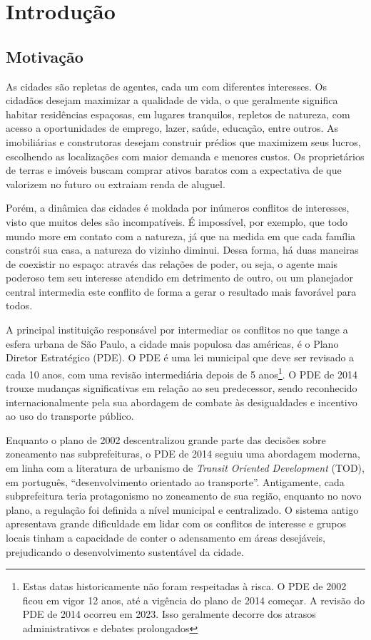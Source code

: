 \chapter{Introdução}

\section{Motivação}

As cidades são repletas de agentes, cada um com diferentes interesses. Os cidadãos desejam maximizar a qualidade de vida, o que geralmente significa habitar residências espaçosas, em lugares tranquilos, repletos de natureza, com acesso a oportunidades de emprego, lazer, saúde, educação, entre outros. As imobiliárias e construtoras desejam construir prédios que maximizem seus lucros, escolhendo as localizações com maior demanda e menores custos. Os proprietários de terras e imóveis buscam comprar ativos baratos com a expectativa de que valorizem no futuro ou extraiam renda de aluguel. 

Porém, a dinâmica das cidades é moldada por inúmeros conflitos de interesses, visto que muitos deles são incompatíveis. É impossível, por exemplo, que todo mundo more em contato com a natureza, já que na medida em que cada família constrói sua casa, a natureza do vizinho diminui. Dessa forma, há duas maneiras de coexistir no espaço: através das relações de poder, ou seja, o agente mais poderoso tem seu interesse atendido em detrimento de outro, ou um planejador central intermedia este conflito de forma a gerar o resultado mais favorável para todos.

A principal instituição responsável por intermediar os conflitos no que tange a esfera urbana de São Paulo, a cidade mais populosa das américas, é o Plano Diretor Estratégico (PDE). O PDE é uma lei municipal que deve ser revisado a cada 10 anos, com uma revisão intermediária depois de 5 anos\footnote{Estas datas historicamente não foram respeitadas à risca. O PDE de 2002 ficou em vigor 12 anos, até a vigência do plano de 2014 começar. A revisão do PDE de 2014 ocorreu em 2023. Isso geralmente decorre dos atrasos administrativos  e debates prolongados}. O PDE de 2014 trouxe mudanças significativas em relação ao seu predecessor, sendo reconhecido internacionalmente pela sua abordagem de combate às desigualdades e incentivo ao uso do transporte público.

Enquanto o plano de 2002 descentralizou grande parte das decisões sobre zoneamento nas subprefeituras, o PDE de 2014 seguiu uma abordagem moderna, em linha com a literatura de urbanismo de \textit{Transit Oriented Development} (TOD), em português, ``desenvolvimento orientado ao transporte''. Antigamente, cada subprefeitura teria protagonismo no zoneamento de sua região, enquanto no novo plano, a regulação foi definida a nível municipal e centralizado. O sistema antigo apresentava grande dificuldade em lidar com os conflitos de interesse e grupos locais tinham a capacidade de conter o adensamento em áreas desejáveis, prejudicando o desenvolvimento sustentável da cidade.

